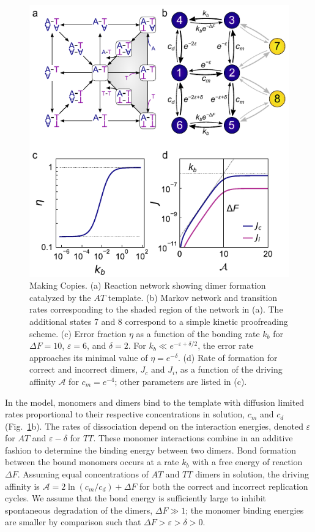 \begin{appendices}
\begin{figure}[h!]
    \centering
    \includegraphics{figures/A5_MakingCopies.pdf}
    \caption{Making Copies. (a) Reaction network showing dimer formation catalyzed by the $AT$ template. (b) Markov network and transition rates corresponding to the shaded region of the network in (a). The additional states 7 and 8 correspond to a simple kinetic proofreading scheme. (c) Error fraction $\eta$ as a function of the bonding rate $k_b$ for $\Delta F = 10$, $\varepsilon = 6$, and $\delta=2$. For $k_b\ll e^{-\varepsilon+\delta/2}$, the error rate approaches its minimal value of $\eta=e^{-\delta}$. (d) Rate of formation for correct and incorrect dimers, $J_c$ and $J_i$, as a function of the driving affinity $\mathcal{A}$ for $c_m=e^{-4}$; other parameters are listed in (c). }
    \label{fig:MakingCopies}
\end{figure}

In the model, monomers and dimers bind to the template with diffusion limited rates proportional to their respective concentrations in solution, $c_m$ and $c_d$ (Fig.~\ref{fig:MakingCopies}b). The rates of dissociation depend on the interaction energies, denoted $\varepsilon$ for $AT$ and $\varepsilon-\delta$ for $TT$. These monomer interactions combine in an additive fashion to determine the binding energy between two dimers. Bond formation between the bound monomers occurs at a rate $k_b$ with a free energy of reaction $\Delta F$.  Assuming equal concentrations of $AT$ and $TT$ dimers in solution, the driving affinity is $\mathcal{A} = 2\ln(c_m/c_d) + \Delta F$ for both the correct and incorrect replication cycles.  We assume that the bond energy is sufficiently large to inhibit spontaneous degradation of the dimers, $\Delta F\gg1$; the monomer binding energies are smaller by comparison such that $\Delta F> \varepsilon>\delta >0 $.


\end{appendices}
